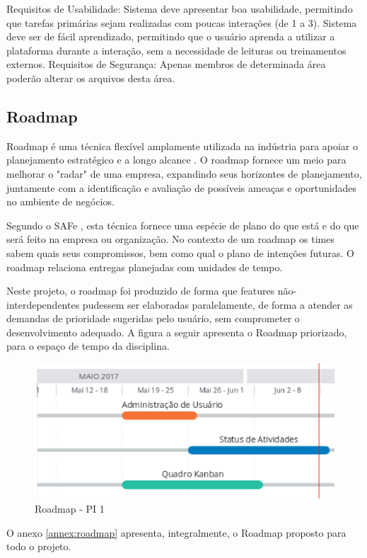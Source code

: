 Requisitos de Usabilidade:
Sistema deve apresentar boa usabilidade, permitindo que tarefas primárias sejam realizadas com poucas interações (de 1 a 3).
Sistema deve ser de fácil aprendizado, permitindo que o usuário aprenda a utilizar a plataforma durante a interação, sem a necessidade de leituras ou treinamentos externos.
Requisitos de Segurança: Apenas membros de determinada área poderão alterar os arquivos desta área.

\subsection{Roadmap}
Roadmap é uma técnica flexível amplamente utilizada na indústria para apoiar o planejamento estratégico e a longo
alcance \cite{phaal}. O roadmap fornece um meio para melhorar o "radar" de uma empresa, expandindo seus horizontes de
planejamento, juntamente com a identificação e avaliação de possíveis ameaças e oportunidades no ambiente de negócios.

Segundo o SAFe \cite{safe}, esta técnica fornece uma espécie de plano do que está e do que será feito na empresa ou organização.
No contexto de um roadmap os times sabem quais seus compromissos, bem como qual o plano de intenções futuras. O roadmap
relaciona entregas planejadas com unidades de tempo.

Neste projeto, o roadmap foi produzido de forma que features não-interdependentes pudessem ser elaboradas paralelamente, de
forma a atender as demandas de prioridade sugeridas pelo usuário, sem comprometer o desenvolvimento adequado. A figura a
seguir apresenta o Roadmap priorizado, para o espaço de tempo da disciplina.

\begin{figure}[!h]
        \centering
        \includegraphics[keepaspectratio=true,scale=0.8]{figuras/roadm.eps}
        \caption{Roadmap - PI 1}
\end{figure}

O anexo \ref{annex:roadmap} apresenta, integralmente, o Roadmap proposto para todo o projeto.
